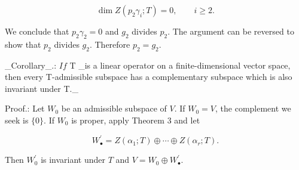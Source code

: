 \[\dim Z(p_{2}\gamma_{i};T)=0,\qquad i\geq 2.\]

We conclude that \(p_{2}\gamma_{2}=0\) and \(g_{2}\) divides \(p_{2}\). The argument can be reversed to show that \(p_{2}\) divides \(g_{2}\). Therefore \(p_{2}=g_{2}\).

_Corollary_.: \(If\) T _is a linear operator on a finite-dimensional vector space, then every T-admissible subspace has a complementary subspace which is also invariant under T._

Proof.: Let \(W_{0}\) be an admissible subspace of \(V\). If \(W_{0}=V\), the complement we seek is \(\{0\}\). If \(W_{0}\) is proper, apply Theorem 3 and let

\[W_{\bullet}^{\prime}=Z(\alpha_{1};T)\oplus\cdots\oplus Z(\alpha_{r};T).\]

Then \(W_{0}^{\prime}\) is invariant under \(T\) and \(V=W_{0}\oplus W_{\bullet}^{\prime}\).

 